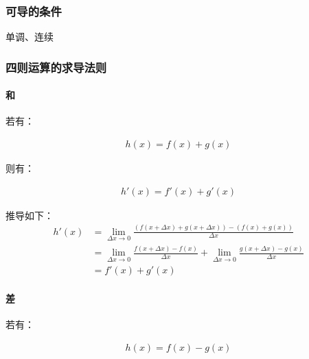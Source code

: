 \documentclass[12pt]{article}
\begin{document}
\subsubsection{可导的条件}

单调、连续

\subsubsection{四则运算的求导法则}

\paragraph{和}

若有：

\begin{equation*}
\begin{aligned}
h(x) = f(x) + g(x)
\end{aligned}
\end{equation*}

则有：

\begin{equation*}
\begin{aligned}
h'(x) = f'(x) + g'(x)
\end{aligned}
\end{equation*}

推导如下：\\

\begin{equation*}
\begin{aligned}
h'(x) & = \lim_{\Delta x \to 0}\frac{(f(x + \Delta x) + g(x + \Delta x)) - (f(x) + g(x))}{\Delta x}\\
& = \lim_{\Delta x \to 0}\frac{f(x + \Delta x) - f(x)}{\Delta x} + \lim_{\Delta x \to 0}\frac{g(x + \Delta x) - g(x)}{\Delta x}\\
& = f'(x) + g'(x)
\end{aligned}
\end{equation*}

\paragraph{差}

若有：

\begin{equation*}
\begin{aligned}
h(x) = f(x) - g(x)
\end{aligned}
\end{equation*}
\end{document}

